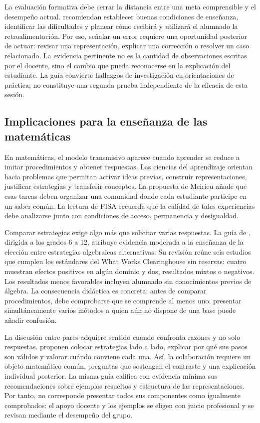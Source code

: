 \documentclass[spanish,letterpaper,oneside]{article}
\begin{document}
La evaluación formativa debe cerrar la distancia entre una meta comprensible y el desempeño actual. \citet[pp.~12--33]{eef2021feedback} recomiendan establecer buenas condiciones de enseñanza, identificar las dificultades y planear cómo recibirá y utilizará el alumnado la retroalimentación. Por eso, señalar un error requiere una oportunidad posterior de actuar: revisar una representación, explicar una corrección o resolver un caso relacionado. La evidencia pertinente no es la cantidad de observaciones escritas por el docente, sino el cambio que pueda reconocerse en la explicación del estudiante. La guía convierte hallazgos de investigación en orientaciones de práctica; no constituye una segunda prueba independiente de la eficacia de esta sesión.

\subsection{Implicaciones para la enseñanza de las matemáticas}

En matemáticas, el modelo transmisivo aparece cuando aprender se reduce a imitar procedimientos y obtener respuestas. Las ciencias del aprendizaje orientan hacia problemas que permitan activar ideas previas, construir representaciones, justificar estrategias y transferir conceptos. La propuesta de Meirieu añade que esas tareas deben organizar una comunidad donde cada estudiante participe en un saber común. La lectura de PISA recuerda que la calidad de tales experiencias debe analizarse junto con condiciones de acceso, permanencia y desigualdad.

Comparar estrategias exige algo más que solicitar varias respuestas. La guía de \citet[pp.~26--27]{star2015algebra}, dirigida a los grados 6 a 12, atribuye evidencia moderada a la enseñanza de la elección entre estrategias algebraicas alternativas. Su revisión reúne seis estudios que cumplen los estándares del What Works Clearinghouse sin reservas: cuatro muestran efectos positivos en algún dominio y dos, resultados mixtos o negativos. Los resultados menos favorables incluyen alumnado sin conocimientos previos de álgebra. La consecuencia didáctica es concreta: antes de comparar procedimientos, debe comprobarse que se comprende al menos uno; presentar simultáneamente varios métodos a quien aún no dispone de una base puede añadir confusión.

La discusión entre pares adquiere sentido cuando confronta razones y no solo respuestas. \citet[p.~34]{star2015algebra} proponen colocar estrategias lado a lado, explicar por qué sus pasos son válidos y valorar cuándo conviene cada una. Así, la colaboración requiere un objeto matemático común, preguntas que sostengan el contraste y una explicación individual posterior. La misma guía califica con evidencia mínima sus recomendaciones sobre ejemplos resueltos y estructura de las representaciones. Por tanto, no corresponde presentar todos sus componentes como igualmente comprobados: el apoyo docente y los ejemplos se eligen con juicio profesional y se revisan mediante el desempeño del grupo.
\end{document}
